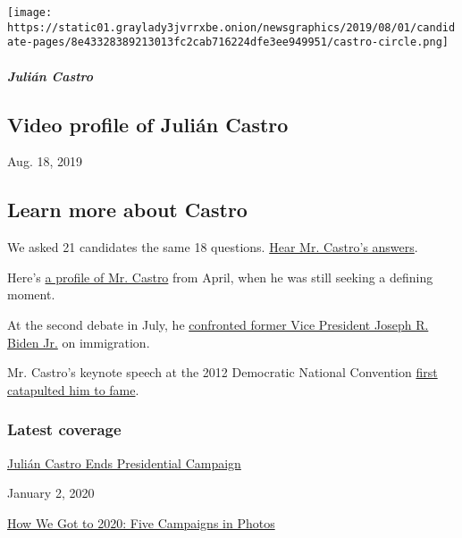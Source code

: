 \texttt{[image: https://static01.graylady3jvrrxbe.onion/newsgraphics/2019/08/01/candidate-pages/8e43328389213013fc2cab716224dfe3ee949951/castro-circle.png]}

\hypertarget{juliuxe1n-castro-1}{%
\subparagraph{Julián Castro}\label{juliuxe1n-castro-1}}

\hypertarget{video-profile-of-juliuxe1n-castro}{%
\subsection{Video profile of Julián
Castro}\label{video-profile-of-juliuxe1n-castro}}

Aug. 18, 2019

\hypertarget{learn-more-about-castro}{%
\subsection{Learn more about Castro}\label{learn-more-about-castro}}

We asked 21 candidates the same 18 questions.
\href{https://www.nytimes3xbfgragh.onion/interactive/2019/us/politics/julian-castro-2020-campaign.html}{Hear
Mr. Castro's answers}.

Here's
\href{https://www.nytimes3xbfgragh.onion/2019/04/17/us/politics/julian-castro-2020.html}{a
profile of Mr. Castro} from April, when he was still seeking a defining
moment.

At the second debate in July, he
\href{https://www.nytimes3xbfgragh.onion/2019/07/31/us/politics/joe-biden-julian-castro-debate.html}{confronted
former Vice President Joseph R. Biden Jr.} on immigration.

Mr. Castro's keynote speech at the 2012 Democratic National Convention
\href{https://www.nytimes3xbfgragh.onion/2019/08/18/us/politics/julian-castro-2020.html}{first
catapulted him to fame}.

\hypertarget{latest-coverage}{%
\subsubsection{Latest coverage}\label{latest-coverage}}

\href{https://www.nytimes3xbfgragh.onion/2020/01/02/us/politics/julian-castro-dropping-out.html}{Julián
Castro Ends Presidential Campaign}

January 2, 2020

\href{https://www.nytimes3xbfgragh.onion/interactive/2019/12/30/us/politics/election-2020-campaign-photos.html}{How
We Got to 2020: Five Campaigns in Photos}

